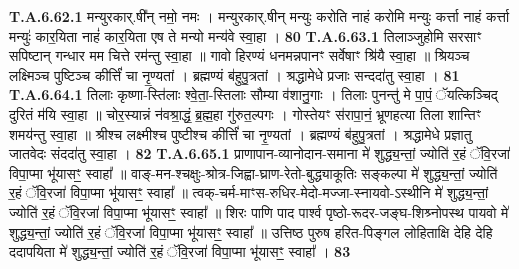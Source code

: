 \documentclass[17pt]{extarticle}
\begin{document}
                                                         \textbf{} \newline \newline
                                \textbf{ T.A.6.62.1} \newline
                  मन्युरकार्.षी᳚न् नमो॒ नमः ।  मन्युरकार्.षीन् मन्युः करोति नाहं करोमि मन्युः कर्त्ता नाहं कर्त्ता मन्युः॑ कार॒यिता नाहं॑ कार॒यिता एष ते मन्यो मन्य॑वे स्वा॒हा । \textbf{ 80} \newline
                  \newline
                                                         \textbf{} \newline \newline
                                \textbf{ T.A.6.63.1} \newline
                  तिलाञ्जुहोमि सरसाꣳ सपिष्टान् गन्धार मम चित्ते रम॑न्तु स्वा॒हा ॥ गावो हिरण्यं धनमन्नपानꣳ सर्वेषाꣳ श्रि॑यै स्वा॒हा ॥ श्रियञ्च लक्ष्मिञ्च पुष्टिञ्च कीर्त्तिं॑ चा नृ॒ण्यतां ।  ब्रह्मण्यं ब॑हुपु॒त्रतां । श्रद्धामेधे प्रजाः सन्ददा॑तु स्वा॒हा । \textbf{ 81} \newline
                  \newline
                                                         \textbf{} \newline \newline
                                \textbf{ T.A.6.64.1} \newline
                  तिलाः कृष्णा-स्ति॑लाः श्वे॒ता॒-स्तिलाः सौम्या व॑शानु॒गाः ।  तिलाः पुनन्तु॑ मे पा॒पं॒ ॅयत्किञ्चिद् दुरितं म॑यि स्वा॒हा ॥ चोर॒स्यान्नं न॑वश्रा॒द्धं॒ ब्र॒ह्म॒हा गु॑रुत॒ल्पगः । गोस्तेयꣳ स॑रापा॒नं॒ भ्रूणहत्या तिला शान्तिꣳ शमय॑न्तु स्वा॒हा ॥  श्रीश्च लक्ष्मीश्च पुष्टीश्च कीर्त्तिं॑ चा नृ॒ण्यतां ।  ब्रह्मण्यं ब॑हुपु॒त्रतां ।  श्रद्धामेधे प्रज्ञातु जातवेदः संददा॑तु स्वा॒हा । \textbf{ 82} \newline
                  \newline
                                                         \textbf{} \newline \newline
                                \textbf{ T.A.6.65.1} \newline
                  प्राणापान-व्यानोदान-समाना मे॑ शुद्ध्य॒न्तां॒  ज्योति॑ र॒हं ॅवि॒रजा॑ विपा॒प्मा भू॑यासꣳ॒॒ स्वाहा᳚ ॥  वाङ्-मन-श्चक्षुः-श्रोत्र-जिह्वा-घ्राण-रेतो-बुद्ध्याकूतिः सङ्कल्पा मे॑ शुद्ध्य॒न्तां॒ ज्योति॑ र॒हं ॅवि॒रजा॑ विपा॒प्मा भू॑यासꣳ॒॒ स्वाहा᳚ ॥  त्वक्-चर्म-माꣳस-रुधिर-मेदो-मज्जा-स्नायवो-ऽस्थीनि  मे॑ शुद्ध्य॒न्तां॒ ज्योति॑ र॒हं ॅवि॒रजा॑ विपा॒प्मा भू॑यासꣳ॒॒ स्वाहा᳚ ॥  शिरः पाणि पाद पार्श्व पृष्ठो-रूदर-जङ्घ-शिश्र्नोपस्थ पायवो मे॑ शुद्ध्य॒न्तां॒ ज्योति॑ र॒हं ॅवि॒रजा॑ विपा॒प्मा भू॑यासꣳ॒॒ स्वाहा᳚ ॥  उत्तिष्ठ पुरुष हरित-पिङ्गल लोहिताक्षि देहि देहि ददापयिता मे॑ शुद्ध्य॒न्तां॒ ज्योति॑ र॒हं ॅवि॒रजा॑ विपा॒प्मा भू॑यासꣳ॒॒ स्वाहा᳚ । \textbf{ 83} \newline
\end{document}
